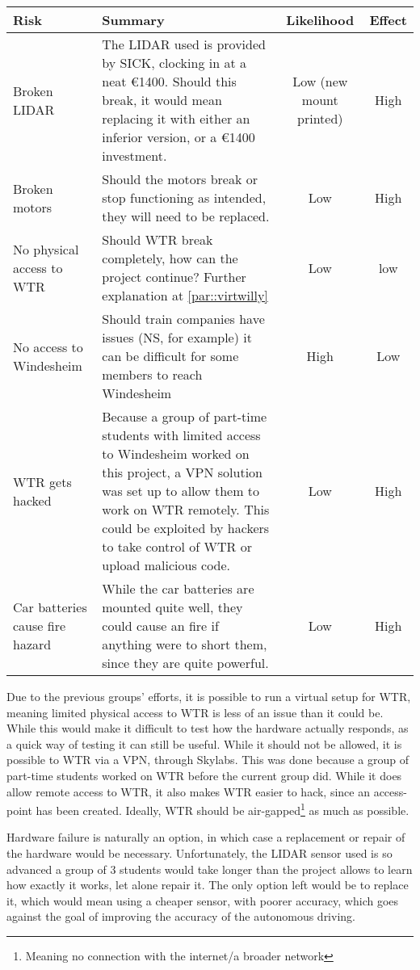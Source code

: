\begin{tabular}{|L{3cm}|L{6cm}|c|c|}
\hline
Risk			 	& Summary			& Likelihood 		& Effect \\ \hline
Broken LIDAR 	& The LIDAR used is provided by SICK, clocking in at a neat \euro 1400. Should this break, it would mean replacing it with either an inferior version, or a \euro 1400 investment. & Low (new mount printed) & High \\ \hline
Broken motors 	& Should the motors break or stop functioning as intended, they will need to be replaced. & Low & High \\ \hline
No physical access to WTR & Should WTR break completely, how can the project continue? Further explanation at \ref{par::virtwilly} & Low & low \\ \hline
No access to Windesheim & Should train companies have issues (NS, for example) it can be difficult for some members to reach Windesheim & 
High & Low \\ \hline
WTR gets hacked  & Because a group of part-time students with limited access to Windesheim worked on this project, a VPN solution was set up to allow them to work on WTR remotely. This could be exploited by hackers to take control of WTR or upload malicious code. & Low  & High \\ \hline
Car batteries cause fire hazard & While the car batteries are mounted quite well, they could cause an fire if anything were to short them, since they are quite powerful. & Low & High \\ \hline

\end{tabular}

Due to the previous groups' efforts, it is possible to run a virtual setup for WTR, meaning limited physical access to WTR is less of an issue than it could be\label{par::virtwilly}.
While this would make it difficult to test how the hardware actually responds, as a quick way of testing it can still be useful.
While it should not be allowed, it is possible to WTR via a VPN, through Skylabs.
This was done because a group of part-time students worked on WTR before the current group did.
While it does allow remote access to WTR, it also makes WTR easier to hack, since an access-point has been created.
Ideally, WTR should be air-gapped\footnote{Meaning no connection with the internet/a broader network} as much as possible.

Hardware failure is naturally an option, in which case a replacement or repair of the hardware would be necessary.
Unfortunately, the LIDAR sensor used is so advanced a group of 3 students would take longer than the project allows to learn how exactly it works, let alone repair it.
The only option left would be to replace it, which would mean using a cheaper sensor, with poorer accuracy, which goes against the goal of improving the accuracy of the autonomous driving.

